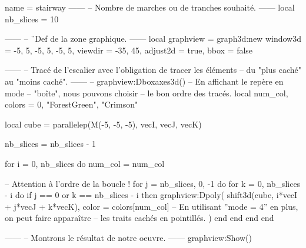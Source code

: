 \documentclass[border = 3pt]{standalone}
\begin{document}
\begin{luadraw}{name = stairway}
------
-- Nombre de marches ou de tranches souhaité.
------
local nb_slices = 10

------
-- ¨Def de la zone graphique.
------
local graphview = graph3d:new{
  window3d = {-5, 5, -5, 5, -5, 5},
  viewdir  = {-35, 45},
  adjust2d = true,
  bbox     = false
}

------
-- Tracé de l'escalier avec l'obligation de tracer les éléments
-- du "plus caché" au "moins caché".
------
-- graphview:Dboxaxes3d()  -- En affichant le repère en mode
                        -- "boîte", nous pouvons choisir
                        -- le bon ordre des tracés.
local num_col, colors = 0, {"ForestGreen", "Crimson"}

local cube = parallelep(M(-5, -5, -5), vecI, vecJ, vecK)

nb_slices = nb_slices - 1

for i = 0, nb_slices do
  num_col = num_col%

-- Attention à l'ordre de la boucle !
  for j = nb_slices, 0, -1 do
    for k = 0, nb_slices - i do
      if j == 0 or k == nb_slices - i then
        graphview:Dpoly(
          shift3d(cube, i*vecI + j*vecJ + k*vecK),
          {
            color = colors[num_col]
-- En utilisant ''mode = 4'' en plus, on peut faire apparaître
-- les traits cachés en pointillés.
          }
        )
      end
    end
  end
end

------
-- Montrons le résultat de notre oeuvre.
------
graphview:Show()
\end{luadraw}
\end{document}
